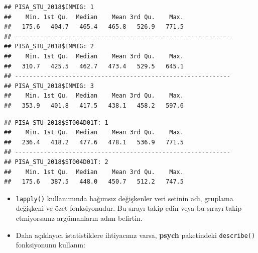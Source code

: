 \documentclass[
  oneside]{book}
\newenvironment{Shaded}{\begin{snugshade}}{\end{snugshade}}
\newcommand{\FunctionTok}[1]{\textcolor[rgb]{0.13,0.29,0.53}{\textbf{#1}}}
\newcommand{\NormalTok}[1]{#1}
\newcommand{\OtherTok}[1]{\textcolor[rgb]{0.56,0.35,0.01}{#1}}
\newcommand{\SpecialCharTok}[1]{\textcolor[rgb]{0.81,0.36,0.00}{\textbf{#1}}}
\begin{document}
\begin{Shaded}
\end{Shaded}

\begin{verbatim}
## PISA_STU_2018$IMMIG: 1
##    Min. 1st Qu.  Median    Mean 3rd Qu.    Max. 
##   175.6   404.7   465.4   465.8   526.9   771.5 
## ------------------------------------------------------------ 
## PISA_STU_2018$IMMIG: 2
##    Min. 1st Qu.  Median    Mean 3rd Qu.    Max. 
##   310.7   425.5   462.7   473.4   529.5   645.1 
## ------------------------------------------------------------ 
## PISA_STU_2018$IMMIG: 3
##    Min. 1st Qu.  Median    Mean 3rd Qu.    Max. 
##   353.9   401.8   417.5   438.1   458.2   597.6
\end{verbatim}

\begin{Shaded}
\end{Shaded}

\begin{verbatim}
## PISA_STU_2018$ST004D01T: 1
##    Min. 1st Qu.  Median    Mean 3rd Qu.    Max. 
##   236.4   418.2   477.6   478.1   536.9   771.5 
## ------------------------------------------------------------ 
## PISA_STU_2018$ST004D01T: 2
##    Min. 1st Qu.  Median    Mean 3rd Qu.    Max. 
##   175.6   387.5   448.0   450.7   512.2   747.5
\end{verbatim}

\begin{itemize}
\item
  \texttt{lapply()} kullanımında bağımsız değişkenler veri setinin adı, gruplama değişkeni ve özet fonksiyonudur. Bu sırayı takip edin veya bu sırayı takip etmiyorsanız argümanların adını belirtin.
\item
  Daha açıklayıcı istatistiklere ihtiyacınız varsa, \textbf{psych} paketindeki \texttt{describe()} fonksiyonunu kullanın:
\end{itemize}
\end{document}
